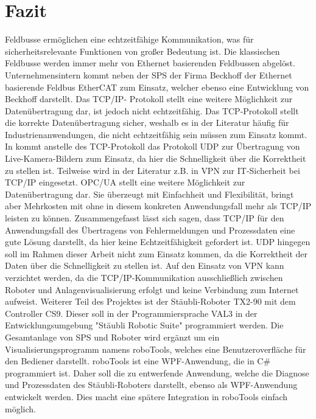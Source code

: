 \documentclass[ a4paper,
                oneside,
                toc=bibliography,
                toc=listof
                ]{scrbook}
\begin{document}
   	
   	\section{Fazit}
   	Feldbusse ermöglichen eine echtzeitfähige Kommunikation, was für sicherheitsrelevante Funktionen von großer Bedeutung ist. Die klassischen Feldbusse werden immer mehr von Ethernet basierenden Feldbussen abgelöst. Unternehmensintern kommt neben der SPS der Firma Beckhoff der Ethernet basierende Feldbus EtherCAT zum Einsatz, welcher ebenso eine Entwicklung von Beckhoff darstellt. Das TCP/IP- Protokoll stellt eine weitere Möglichkeit zur Datenübertragung dar, ist jedoch nicht echtzeitfähig. Das TCP-Protokoll stellt die korrekte Datenübertragung sicher, weshalb es in der Literatur häufig für Industrienanwendungen, die nicht echtzeitfähig sein müssen zum Einsatz kommt.
   	In \cite{groza2008using} kommt anstelle des TCP-Protokoll das Protokoll UDP zur Übertragung von Live-Kamera-Bildern zum Einsatz, da hier die Schnelligkeit über die Korrektheit zu stellen ist. Teilweise wird in der Literatur z.B. in \cite{groza2008using} VPN zur IT-Sicherheit bei TCP/IP eingesetzt. OPC/UA stellt eine weitere Möglichkeit zur Datenübertragung dar. Sie überzeugt mit Einfachheit und Flexibilität, bringt aber Mehrkosten mit ohne in diesem konkreten Anwendungsfall mehr als TCP/IP leisten zu können. Zusammengefasst lässt sich sagen, dass TCP/IP für den Anwendungsfall des Übertragens von Fehlermeldungen und Prozessdaten eine gute Lösung darstellt, da hier keine Echtzeitfähigkeit gefordert ist. UDP hingegen soll im Rahmen dieser Arbeit nicht zum Einsatz kommen, da die Korrektheit der Daten über die Schnelligkeit zu stellen ist. Auf den Einsatz von VPN kann verzichtet werden, da die TCP/IP-Kommunikation ausschließlich zwischen Roboter und Anlagenvisualisierung erfolgt und keine Verbindung zum Internet aufweist. Weiterer Teil des Projektes ist der Stäubli-Roboter TX2-90 mit dem Controller CS9. Dieser soll in der Programmiersprache VAL3 in der Entwicklungsumgebung "Stäubli Robotic Suite" programmiert werden. Die Gesamtanlage von SPS und Roboter wird ergänzt um ein Visualisierungsprogramm namens roboTools, welches eine Benutzeroverfläche für den Bediener darstellt. roboTools ist eine WPF-Anwendung, die in C\# programmiert ist. Daher soll die zu entwerfende Anwendung, welche die Diagnose und Prozessdaten des Stäubli-Roboters darstellt, ebenso als WPF-Anwendung entwickelt werden. Dies macht eine spätere Integration in roboTools einfach möglich.
   	
	\newpage
	
\end{document}
